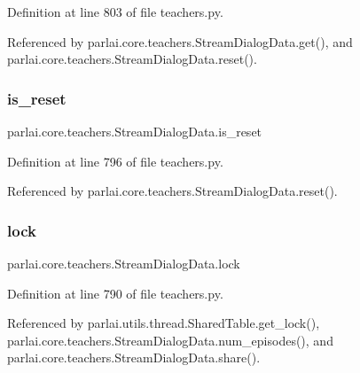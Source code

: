 Definition at line 803 of file teachers.\+py.



Referenced by parlai.\+core.\+teachers.\+Stream\+Dialog\+Data.\+get(), and parlai.\+core.\+teachers.\+Stream\+Dialog\+Data.\+reset().

\mbox{\label{classparlai_1_1core_1_1teachers_1_1StreamDialogData_a30ca966ffb33e7cbc8f97e9b8837cbc1}} 
\subsubsection{\texorpdfstring{is\+\_\+reset}{is\_reset}}
{\footnotesize\ttfamily parlai.\+core.\+teachers.\+Stream\+Dialog\+Data.\+is\+\_\+reset}



Definition at line 796 of file teachers.\+py.



Referenced by parlai.\+core.\+teachers.\+Stream\+Dialog\+Data.\+reset().

\mbox{\label{classparlai_1_1core_1_1teachers_1_1StreamDialogData_adcc1f5f967652688ec8dbcfb3abbcaa6}} 
\subsubsection{\texorpdfstring{lock}{lock}}
{\footnotesize\ttfamily parlai.\+core.\+teachers.\+Stream\+Dialog\+Data.\+lock}



Definition at line 790 of file teachers.\+py.



Referenced by parlai.\+utils.\+thread.\+Shared\+Table.\+get\+\_\+lock(), parlai.\+core.\+teachers.\+Stream\+Dialog\+Data.\+num\+\_\+episodes(), and parlai.\+core.\+teachers.\+Stream\+Dialog\+Data.\+share().


